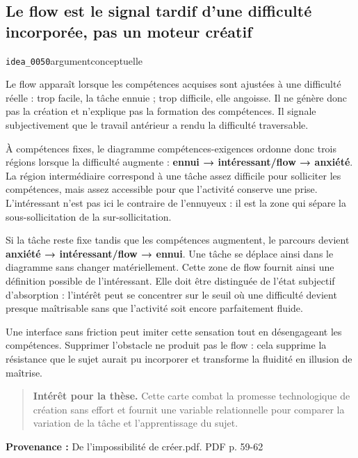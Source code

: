 \documentclass[10pt,a4paper]{article}
\begin{document}
\subsection{Le flow est le signal tardif d'une difficulté incorporée, pas un moteur créatif}
{\small\color{metadata} \texttt{idea\_0050}\quad\textbullet\quad argument\quad\textbullet\quad conceptuelle\par}

Le flow apparaît lorsque les compétences acquises sont ajustées à une difficulté réelle : trop facile, la tâche ennuie ; trop difficile, elle angoisse. Il ne génère donc pas la création et n'explique pas la formation des compétences. Il signale subjectivement que le travail antérieur a rendu la difficulté traversable.

À compétences fixes, le diagramme compétences-exigences ordonne donc trois régions lorsque la difficulté augmente : \textbf{ennui → intéressant/flow → anxiété}. La région intermédiaire correspond à une tâche assez difficile pour solliciter les compétences, mais assez accessible pour que l'activité conserve une prise. L'intéressant n'est pas ici le contraire de l'ennuyeux : il est la zone qui sépare la sous-sollicitation de la sur-sollicitation.

Si la tâche reste fixe tandis que les compétences augmentent, le parcours devient \textbf{anxiété → intéressant/flow → ennui}. Une tâche se déplace ainsi dans le diagramme sans changer matériellement. Cette zone de flow fournit ainsi une définition possible de l'intéressant. Elle doit être distinguée de l'état subjectif d'absorption : l'intérêt peut se concentrer sur le seuil où une difficulté devient presque maîtrisable sans que l'activité soit encore parfaitement fluide.

Une interface sans friction peut imiter cette sensation tout en désengageant les compétences. Supprimer l'obstacle ne produit pas le flow : cela supprime la résistance que le sujet aurait pu incorporer et transforme la fluidité en illusion de maîtrise.

\begin{quote}
\textbf{Intérêt pour la thèse.} Cette carte combat la promesse technologique de création sans effort et fournit une variable relationnelle pour comparer la variation de la tâche et l'apprentissage du sujet.
\end{quote}
{\footnotesize\color{metadata}\textbf{Provenance :} De l'impossibilité de créer.pdf. PDF p. 59-62\par}
\end{document}
